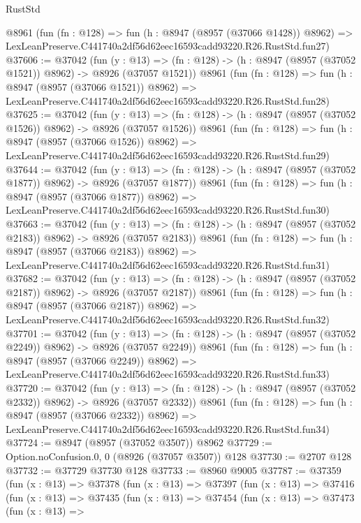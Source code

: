 \begin{lexlean}{RustStd}
\begin{coremodule}
    @8961
    (fun (fn : @128) =>
    fun (h : @8947 (@8957 (@37066 @1428)) @8962) =>
    LexLeanPreserve.C441740a2df56d62eec16593cadd93220.R26.RustStd.fun27)
@37606 := @37042
    (fun (y : @13) =>
    (fn : @128) -> (h : @8947 (@8957 (@37052 @1521)) @8962) -> @8926 (@37057 @1521))
    @8961
    (fun (fn : @128) =>
    fun (h : @8947 (@8957 (@37066 @1521)) @8962) =>
    LexLeanPreserve.C441740a2df56d62eec16593cadd93220.R26.RustStd.fun28)
@37625 := @37042
    (fun (y : @13) =>
    (fn : @128) -> (h : @8947 (@8957 (@37052 @1526)) @8962) -> @8926 (@37057 @1526))
    @8961
    (fun (fn : @128) =>
    fun (h : @8947 (@8957 (@37066 @1526)) @8962) =>
    LexLeanPreserve.C441740a2df56d62eec16593cadd93220.R26.RustStd.fun29)
@37644 := @37042
    (fun (y : @13) =>
    (fn : @128) -> (h : @8947 (@8957 (@37052 @1877)) @8962) -> @8926 (@37057 @1877))
    @8961
    (fun (fn : @128) =>
    fun (h : @8947 (@8957 (@37066 @1877)) @8962) =>
    LexLeanPreserve.C441740a2df56d62eec16593cadd93220.R26.RustStd.fun30)
@37663 := @37042
    (fun (y : @13) =>
    (fn : @128) -> (h : @8947 (@8957 (@37052 @2183)) @8962) -> @8926 (@37057 @2183))
    @8961
    (fun (fn : @128) =>
    fun (h : @8947 (@8957 (@37066 @2183)) @8962) =>
    LexLeanPreserve.C441740a2df56d62eec16593cadd93220.R26.RustStd.fun31)
@37682 := @37042
    (fun (y : @13) =>
    (fn : @128) -> (h : @8947 (@8957 (@37052 @2187)) @8962) -> @8926 (@37057 @2187))
    @8961
    (fun (fn : @128) =>
    fun (h : @8947 (@8957 (@37066 @2187)) @8962) =>
    LexLeanPreserve.C441740a2df56d62eec16593cadd93220.R26.RustStd.fun32)
@37701 := @37042
    (fun (y : @13) =>
    (fn : @128) -> (h : @8947 (@8957 (@37052 @2249)) @8962) -> @8926 (@37057 @2249))
    @8961
    (fun (fn : @128) =>
    fun (h : @8947 (@8957 (@37066 @2249)) @8962) =>
    LexLeanPreserve.C441740a2df56d62eec16593cadd93220.R26.RustStd.fun33)
@37720 := @37042
    (fun (y : @13) =>
    (fn : @128) -> (h : @8947 (@8957 (@37052 @2332)) @8962) -> @8926 (@37057 @2332))
    @8961
    (fun (fn : @128) =>
    fun (h : @8947 (@8957 (@37066 @2332)) @8962) =>
    LexLeanPreserve.C441740a2df56d62eec16593cadd93220.R26.RustStd.fun34)
@37724 := @8947 (@8957 (@37052 @3507)) @8962
@37729 := Option.noConfusion.{0, 0} (@8926 (@37057 @3507)) @128
@37730 := @2707 @128
@37732 := @37729 @37730 @128
@37733 := @8960 @9005
@37787 := @37359
    (fun (x : @13) =>
    @37378
      (fun (x : @13) =>
      @37397
        (fun (x : @13) =>
        @37416
          (fun (x : @13) =>
          @37435
            (fun (x : @13) =>
            @37454
              (fun (x : @13) =>
              @37473
                (fun (x : @13) =>

\end{coremodule}
\end{lexlean}
